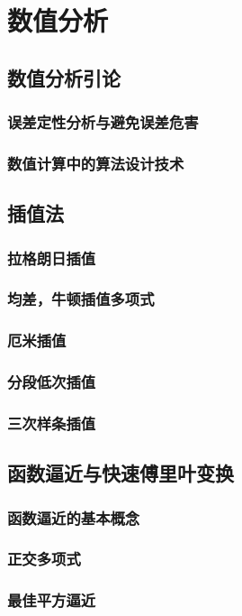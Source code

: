 \part{数值分析}
\chapter{数值分析引论}


\section{误差定性分析与避免误差危害}
\section{数值计算中的算法设计技术}

\chapter{插值法}
\section{拉格朗日插值}
\section{均差，牛顿插值多项式}
\section{厄米插值}
\section{分段低次插值}
\section{三次样条插值}

\chapter{函数逼近与快速傅里叶变换}
\section{函数逼近的基本概念}
\section{正交多项式}
\section{最佳平方逼近}
